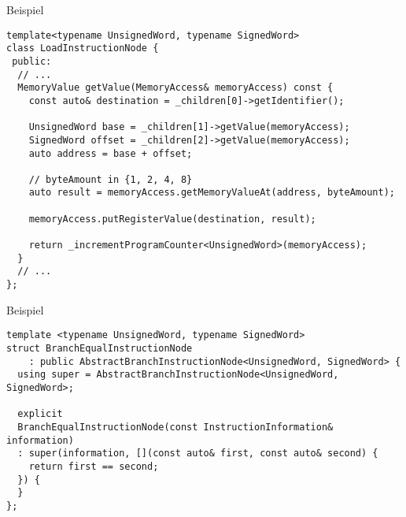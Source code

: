 \begin{frame}[fragile]{Beispiel}
\begin{lstlisting}[style=C++]
template<typename UnsignedWord, typename SignedWord>
class LoadInstructionNode {
 public:
  // ...
  MemoryValue getValue(MemoryAccess& memoryAccess) const {
    const auto& destination = _children[0]->getIdentifier();

    UnsignedWord base = _children[1]->getValue(memoryAccess);
    SignedWord offset = _children[2]->getValue(memoryAccess);
    auto address = base + offset;

    // byteAmount in {1, 2, 4, 8}
    auto result = memoryAccess.getMemoryValueAt(address, byteAmount);

    memoryAccess.putRegisterValue(destination, result);

    return _incrementProgramCounter<UnsignedWord>(memoryAccess);
  }
  // ...
};
\end{lstlisting}
\end{frame}

\begin{frame}[fragile]{Beispiel}
\begin{lstlisting}[style=C++]
template <typename UnsignedWord, typename SignedWord>
struct BranchEqualInstructionNode
    : public AbstractBranchInstructionNode<UnsignedWord, SignedWord> {
  using super = AbstractBranchInstructionNode<UnsignedWord, SignedWord>;

  explicit
  BranchEqualInstructionNode(const InstructionInformation& information)
  : super(information, [](const auto& first, const auto& second) {
    return first == second;
  }) {
  }
};
\end{lstlisting}
\end{frame}
